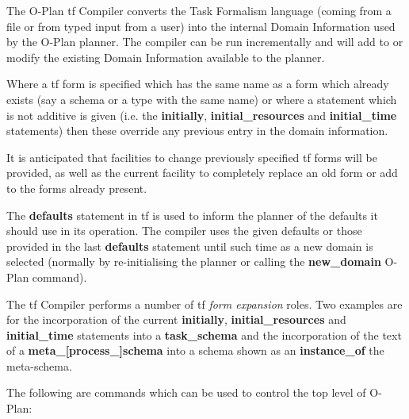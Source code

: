 The O-Plan {\sc tf} Compiler converts the Task Formalism language
(coming from a file or from typed input from a user) into the
internal Domain Information used by the O-Plan planner.  The compiler
can be run incrementally and will add to or modify the existing Domain
Information available to the planner.

Where a {\sc tf} form is specified which has the same name as a form which
already exists (say a schema or a type with the same name) or where a
statement which is not additive is given (i.e.  the {\bf initially}, {\bf
initial\_resources} and {\bf initial\_time} statements) then these override
any previous entry in the domain information.

It is anticipated that facilities to change previously
specified {\sc tf} forms will be provided, as well as the current facility
to completely replace an old form or add to the forms already present.

The {\bf defaults} statement in {\sc tf} is used to
inform the planner of the defaults it should use in its operation. 
The compiler uses the given defaults or those provided in the last {\bf
defaults} statement until such time as a new domain is
selected (normally by re-initialising the planner or calling the {\bf
new\_domain} O-Plan command).

The {\sc tf} Compiler performs a number of {\sc tf } {\em form expansion}
roles.  Two examples are for the incorporation of the current {\bf initially},
{\bf initial\_resources} and {\bf initial\_time} statements into a {\bf
task\_schema} and the incorporation of the text of a {\bf
meta\_[process\_]schema} into a schema shown as an {\bf instance\_of} the
meta-schema.



The following are commands which can be used to control the top level of
O-Plan:


